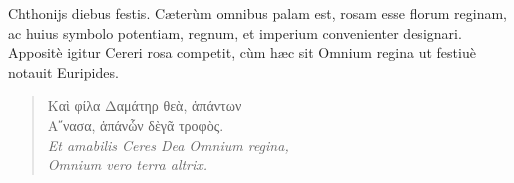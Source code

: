 \documentclass[a4paper, 11pt, oneside, polutonikogreek, latin]{article}
\begin{document}
Chthonijs diebus festis. Cæterùm omnibus palam est, rosam esse florum reginam, ac huius symbolo potentiam, regnum, et imperium convenienter designari. Appositè igitur Cereri rosa competit, cùm hæc sit Omnium regina ut festiuè notauit Euripides.
\begin{quote}
Καὶ φίλα Δαμάτηρ θεὰ, ἁπάντων\\
Α῎νασα, ἁπάνὧν δὲγᾶ τροφὸς.\\

\emph{Et amabilis Ceres Dea Omnium regina,}\\
\emph{Omnium vero terra altrix.}\\
\end{quote}
\vspace*{-8mm}
\paragraph{}
\end{document}
